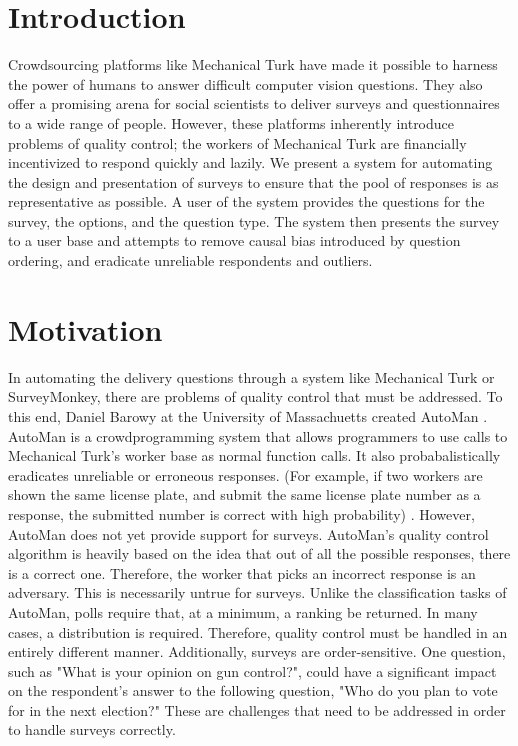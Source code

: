 \documentclass{article}
\begin{document}
\section{Introduction}
Crowdsourcing platforms like Mechanical Turk have made it possible to harness the power of humans to answer difficult computer vision questions. They also offer a promising arena for social scientists to deliver surveys and questionnaires to a wide range of people. However, these platforms inherently introduce problems of quality control; the workers of Mechanical Turk are financially incentivized to respond quickly and lazily. We present a system for automating the design and presentation of surveys to ensure that the pool of responses is as representative as possible. A user of the system provides the questions for the survey, the options, and the question type. The system then presents the survey to a user base and attempts to remove causal bias introduced by question ordering, and eradicate unreliable respondents and outliers.
\section{Motivation}
In automating the delivery questions through a system like Mechanical Turk or SurveyMonkey, there are problems of quality control that must be addressed. To this end, Daniel Barowy at the University of Massachuetts created AutoMan \cite{automan}. AutoMan is a crowdprogramming system that allows programmers to use calls to Mechanical Turk's worker base as normal function calls. It also probabalistically eradicates unreliable or erroneous responses. (For example, if two workers are shown the same license plate, and submit the same license plate number as a response, the submitted number is correct with high probability) \cite{automan}. However, AutoMan does not yet provide support for surveys. AutoMan's quality control algorithm is heavily based on the idea that out of all the possible responses, there is a correct one. Therefore, the worker that picks an incorrect response is an adversary. This is necessarily untrue for surveys. Unlike the classification tasks of AutoMan, polls require that, at a minimum, a ranking be returned. In many cases, a distribution is required. Therefore, quality control must be handled in an entirely different manner. Additionally, surveys are order-sensitive. One question, such as "What is your opinion on gun control?", could have a significant impact on the respondent's answer to the following question, "Who do you plan to vote for in the next election?" These are challenges that need to be addressed in order to handle surveys correctly.
\end{document}
